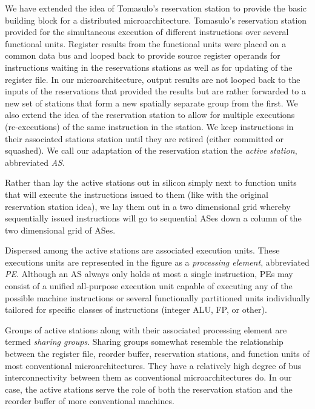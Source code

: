 \documentclass[10pt,dvips]{article}
\begin{document}
We have extended the idea of Tomasulo's reservation
station \cite{Tom67} to provide the basic building block for a distributed
microarchitecture.  Tomasulo's reservation station provided for the
simultaneous execution of different instructions over several
functional units.  
Register results from the functional units were placed on
a common data bus and looped back to provide source register operands 
for instructions waiting in the reservations stations as well as
for updating of the register file.  In our microarchitecture,
output results are not looped back to the inputs of the reservations
that provided the results but are rather forwarded to a new set of
stations that form a new spatially separate group from the first.  
We
also extend the idea of the reservation station to allow for multiple
executions (re-executions) of the same instruction in the station.  We
keep instructions in their associated stations station until they are
retired (either committed or squashed).  We call our adaptation of the
reservation station the \textit{active station}, abbreviated
\textit{AS}.

Rather than lay the active stations out in silicon simply next to
function units that will execute the instructions issued to them
(like with the original reservation station idea),
we lay them out in a two dimensional grid whereby sequentially
issued instructions will go to sequential ASes down a column of
the two dimensional grid of ASes. 

Dispersed among the active stations are associated execution
units.  These executions units are represented in the figure as
a \textit{processing element}, abbreviated \textit{PE}.  
Although an AS always only holds at most a single instruction,
PEs may consist of a unified all-purpose execution unit capable of
executing any of the possible machine instructions or
several functionally partitioned units individually tailored
for specific classes of instructions (integer ALU, FP, or other).

Groups of active stations along with their associated processing
element
are termed \textit{sharing groups}.  Sharing groups somewhat resemble
the relationship between the register file, reorder buffer,
reservation stations, and function units of most conventional
microarchitectures.  They have a relatively high degree of bus
interconnectivity between them as conventional microarchitectures do.
In our case, the active stations serve the role of both the
reservation station and the reorder buffer of more conventional
machines.
\end{document}
